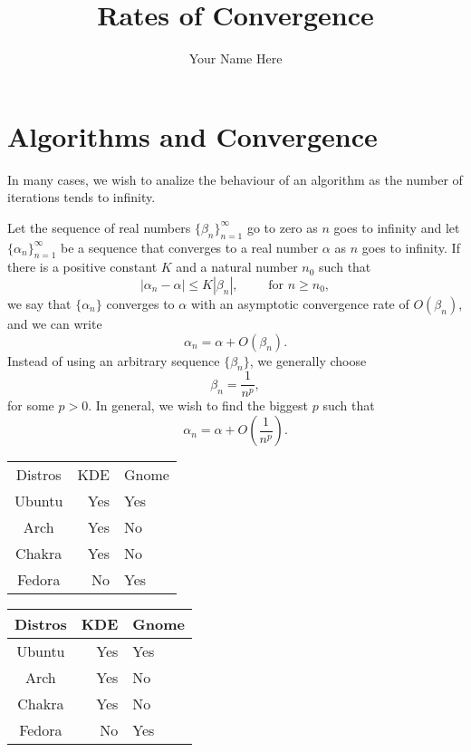 \documentclass{article}
\title{Rates of Convergence}
\author{Your Name Here}
\begin{document}
\maketitle

\section{Algorithms and Convergence}

In many cases, we wish to analize the behaviour of an algorithm as the number of iterations tends to infinity.

Let the sequence of real numbers $\{ \beta_n\}_{n=1}^{\infty}$ go to zero as $n$ goes to infinity and let $\{\alpha_n\}_{n=1}^{\infty}$ be a sequence that converges to a real number $\alpha$ as $n$ goes to infinity. If there is a positive constant $K$ and a natural number $n_0$ such that
\begin{equation}
|\alpha_n-\alpha| \leq K|\beta_n|, \qquad \text{ for } n\geq n_0,
\end{equation}
we say that $\{\alpha_n\}$ converges to $\alpha$ with an asymptotic convergence rate of $O(\beta_n)$, and we can write
%
%
$$\alpha_n = \alpha + O(\beta_n).$$
%
%
Instead of using an arbitrary sequence $\{\beta_n\}$, we generally choose
$$\beta_n = \frac{1}{n^p},$$
for some $p>0$. In general, we wish to find the biggest $p$ such that
$$\alpha_n = \alpha + O\left(\frac{1}{n^p}\right).$$

\begin{center}
  \begin{tabular}{c r l}
    Distros & KDE & Gnome\\
    Ubuntu & Yes & Yes\\
    Arch & Yes & No\\
    Chakra & Yes & No\\
    Fedora & No & Yes
  \end{tabular}
\end{center}

\begin{center}
  \begin{tabular}{| c | r | l |}
    \hline
    Distros & KDE & Gnome\\\hline
    Ubuntu & Yes & Yes\\\hline
    Arch & Yes & No\\\hline
    Chakra & Yes & No\\\hline
    Fedora & No & Yes\\\hline
  \end{tabular}
\end{center}
%
%
\end{document}
